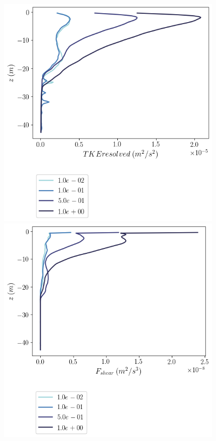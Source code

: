 \documentclass[draft]{agujournal2019}
\begin{document}
\begin{figure}
    \centering
    \begin{minipage}{0.5\textwidth}
        \includegraphics[trim={0 4.5cm 0 0},clip, width=\textwidth]{Figures/eres_cmp_dslope_43h_tav13h_z_profile.png}
    \end{minipage}%
    \begin{minipage}{0.5\textwidth}
        \includegraphics[trim={0 4cm 0 0},clip,width=\textwidth]{Figures/Fshear_cmp_dslope_46h_tav13_z_profile.png}    

\end{minipage}
\end{figure}
\end{document}
